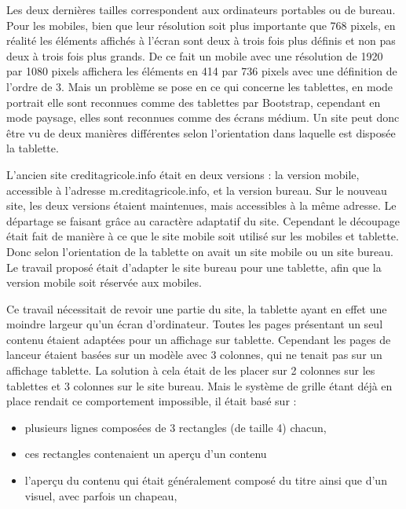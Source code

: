 \documentclass[12pt,a4paper]{article}
\begin{document}
Les deux dernières tailles correspondent aux ordinateurs portables ou de bureau. Pour les mobiles, bien que leur résolution soit plus importante que 768 pixels, en réalité les éléments affichés à l'écran sont deux à trois fois plus définis et non pas deux à trois fois plus grands. De ce fait un mobile avec une résolution de 1920 par 1080 pixels affichera les éléments en 414 par 736 pixels avec une définition de l'ordre de 3. Mais un problème se pose en ce qui concerne les tablettes, en mode portrait elle sont reconnues comme des tablettes par Bootstrap, cependant en mode paysage, elles sont reconnues comme des écrans médium. Un site peut donc être vu de deux manières différentes selon l'orientation dans laquelle est disposée la tablette.\par
\bigskip
L'ancien site creditagricole.info était en deux versions : la version mobile, accessible à l'adresse m.creditagricole.info, et la version bureau. Sur le nouveau site, les deux versions étaient maintenues, mais accessibles à la même adresse. Le départage se faisant grâce au caractère adaptatif du site. Cependant le découpage était fait de manière à ce que le site mobile soit utilisé sur les mobiles et tablette. Donc selon l'orientation de la tablette on avait un site mobile ou un site bureau. Le travail proposé était d'adapter le site bureau pour une tablette, afin que la version mobile soit réservée aux mobiles.\par
Ce travail nécessitait de revoir une partie du site, la tablette ayant en effet une moindre largeur qu'un écran d'ordinateur. Toutes les pages présentant un seul contenu étaient adaptées pour un affichage sur tablette. Cependant les pages de lanceur étaient basées sur un modèle avec 3 colonnes, qui ne tenait pas sur un affichage tablette. La solution à cela était de les placer sur 2 colonnes sur les tablettes et 3 colonnes sur le site bureau. Mais le système de grille étant déjà en place rendait ce comportement impossible, il était basé sur :
\begin{itemize}
\item plusieurs lignes composées de 3 rectangles (de taille 4) chacun,
\item ces rectangles contenaient un aperçu d'un contenu
\item l'aperçu du contenu qui était généralement composé du titre ainsi que d'un visuel, avec parfois un chapeau,
\end{itemize}
\end{document}
